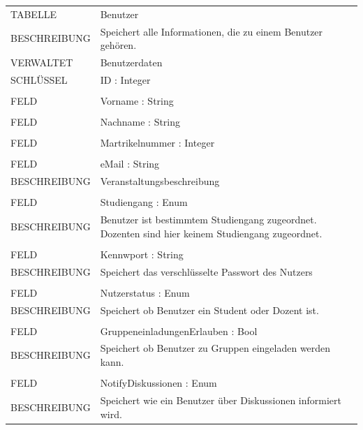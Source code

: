 \documentclass[12pt,a4paper]{article}
\begin{document}
\begin{tabular}{|lp{12cm}|}
	\hline
	TABELLE			&  Benutzer\\ 
	BESCHREIBUNG	&  Speichert alle Informationen, die zu einem Benutzer gehören.\\ 
	VERWALTET		& Benutzerdaten\\ 
	SCHLÜSSEL		&  ID : Integer\\ 
	\hline
	&  \\ 
	FELD		    &  Vorname : String\\  
	&  \\ 
	FELD		    &  Nachname : String\\  
	&  \\ 
	FELD		    &  Martrikelnummer : Integer\\  
	&  \\
	FELD		    &  eMail : String\\ 
	BESCHREIBUNG	&  Veranstaltungsbeschreibung\\
	&  \\
	FELD		    &  Studiengang : Enum\\ 
	BESCHREIBUNG	&  Benutzer ist bestimmtem Studiengang zugeordnet. Dozenten sind hier keinem Studiengang zugeordnet.\\ 
	&  \\
	FELD		    &  Kennwport : String\\ 
	BESCHREIBUNG	&  Speichert das verschlüsselte Passwort des Nutzers \\
	&  \\
	FELD		    &  Nutzerstatus : Enum\\ 
	BESCHREIBUNG	&  Speichert ob Benutzer ein Student oder Dozent ist.\\
	&  \\
	FELD		    &  GruppeneinladungenErlauben : Bool\\ 
	BESCHREIBUNG	&  Speichert ob Benutzer zu Gruppen eingeladen werden kann.\\
	&  \\
	FELD		    &  NotifyDiskussionen : Enum\\ 
	BESCHREIBUNG	&  Speichert wie ein Benutzer über Diskussionen informiert wird.\\
	\hline
\end{tabular}\\\\
\end{document}
